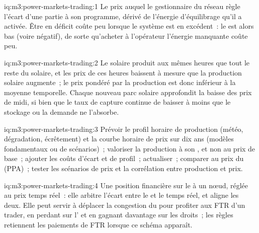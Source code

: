\begin{solution}{iq:m3:power-markets-trading:1}
Le prix auquel le gestionnaire du réseau règle l'écart d'une partie à son programme, dérivé de
l'énergie d'équilibrage qu'il a activée. Être en déficit coûte peu lorsque le système est en excédent~: le  est alors bas (voire négatif), de sorte qu'acheter à l'opérateur l'énergie manquante coûte peu.
\end{solution}

\begin{solution}{iq:m3:power-markets-trading:2}
Le solaire produit aux mêmes heures que tout le reste du solaire, et les prix de ces heures baissent à mesure que la production solaire
augmente~; le prix pondéré par la production est donc inférieur à la moyenne temporelle. Chaque nouveau parc solaire approfondit
la baisse des prix de midi, si bien que le taux de capture continue de baisser à moins que le stockage ou la demande ne l'absorbe.
\end{solution}

\begin{solution}{iq:m3:power-markets-trading:3}
Prévoir le profil horaire de production (météo, dégradation, écrêtement) et la courbe horaire de prix
sur dix ans (modèles fondamentaux ou de scénarios)~; valoriser la production à son , et non
au prix de base~; ajouter les coûts d'écart et de profil~; actualiser~; comparer au prix du  (PPA)~; tester
les scénarios de prix et la corrélation entre production et prix.
\end{solution}

\begin{solution}{iq:m3:power-markets-trading:4}
Une position financière sur le  à un nœud, réglée au prix temps réel~: elle arbitre
l'écart entre le  et le temps réel, et aligne les deux. Elle peut servir à déplacer la congestion du  pour
profiter aux FTR d'un trader, en perdant sur l' et en gagnant davantage sur les droits~; les règles retiennent les
paiements de FTR lorsque ce schéma apparaît.
\end{solution}

